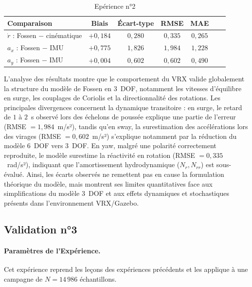 \documentclass{rapportEILCO}
\begin{document}
	\begin{table}[H]
		\centering
		\caption{Epérience n°2}
		\label{tab:stats_exp_1}
		\begin{tabular}{lcccccc}
			\toprule
			\textbf{Comparaison} & \textbf{Biais} & \textbf{Écart-type} & \textbf{RMSE}
			& \textbf{MAE}\\
			\midrule
			
			$\dot r$ : Fossen $-$ cinématique
			& $+0,184$ & $0,280$ & $0,335$ & $0,265$ \\
			
			$a_x$ : Fossen $-$ IMU
			& $+0,775$ & $1,826$ & $1,984$ & $1,228$\\
			
			$a_y$ : Fossen $-$ IMU
			& $+0,004$ & $0,602$ & $0,602$ & $0,490$\\
			
			\bottomrule
		\end{tabular}
	\end{table}
	
	L’analyse des résultats montre que le comportement du VRX valide globalement la structure du modèle de Fossen en 3~DOF, notamment les vitesses d’équilibre en surge, les couplages de Coriolis et la directionnalité des rotations. Les principales divergences concernent la dynamique transitoire : en surge, le retard de $1$ à $2$~s observé lors des échelons de poussée explique une partie de l’erreur (RMSE $=1{,}984$~m/s²), tandis qu’en sway, la surestimation des accélérations lors des virages (RMSE $=0{,}602$~m/s²) s’explique notamment par la réduction du modèle 6~DOF vers 3~DOF. En yaw, malgré une polarité correctement reproduite, le modèle surestime la réactivité en rotation (RMSE $=0{,}335$~rad/s²), indiquant que l’amortissement hydrodynamique ($N_r,N_{rr}$) est sous-évalué. Ainsi, les écarts observés ne remettent pas en cause la formulation théorique du modèle, mais montrent ses limites quantitatives face aux simplifications du modèle 3~DOF et aux effets dynamiques et stochastiques présents dans l’environnement VRX/Gazebo.
	
	
	
	
	
	\subsection{Validation n°3}
	\label{sec:exp_3}
	
	\paragraph{Paramètres de l'Expérience.}
	Cet expérience reprend les leçons des expériences précédents et les applique à une campagne de
	$N = 14\,986$ échantillons.
	
\end{document}
